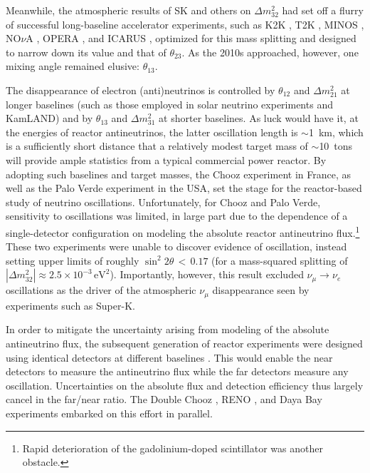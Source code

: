 \documentclass[../thesis.tex]{subfiles}
\begin{document}
Meanwhile, the atmospheric results of SK and others on \(\Delta m^2_{32}\) had set off a flurry of successful long-baseline accelerator experiments, such as K2K \cite{PhysRevD.74.072003}, T2K \cite{ABE2011106}, MINOS \cite{PhysRevLett.101.131802}, NO$\nu$A \cite{PhysRevLett.123.151803}, OPERA \cite{Agafonova_2012}, and ICARUS \cite{Rubbia_2011}, optimized for this mass splitting and designed to narrow down its value and that of $\theta_{23}$. As the 2010s approached, however, one mixing angle remained elusive: $\theta_{13}$.

The disappearance of electron (anti)neutrinos is controlled by $\theta_{12}$ and \(\Delta m^2_{21}\) at longer baselines (such as those employed in solar neutrino experiments and KamLAND) and by $\theta_{13}$ and \(\Delta m^2_{31}\) at shorter baselines. As luck would have it, at the energies of reactor antineutrinos, the latter oscillation length is $\sim$1~km, which is a sufficiently short distance that a relatively modest target mass of $\sim$10~tons will provide ample statistics from a typical commercial power reactor. By adopting such baselines and target masses, the Chooz experiment in France, as well as the Palo Verde experiment in the USA, set the stage for the reactor-based study of neutrino oscillations. Unfortunately, for Chooz and Palo Verde, sensitivity to oscillations was limited, in large part due to the dependence of a single-detector configuration on modeling the absolute reactor antineutrino flux.\footnote{Rapid deterioration of the gadolinium-doped scintillator was another obstacle.} These two experiments were unable to discover evidence of oscillation, instead setting upper limits of roughly $\sin^2 2\theta\,<\,0.17$ (for a mass-squared splitting of $|\Delta m^2_{32}| \approx 2.5\times10^{-3}\,\text{eV}^2$). Importantly, however, this result excluded $\nu_\mu \rightarrow \nu_e$ oscillations as the driver of the atmospheric $\nu_\mu$ disappearance seen by experiments such as Super-K.

In order to mitigate the uncertainty arising from modeling of the absolute antineutrino flux, the subsequent generation of reactor experiments were designed using identical detectors at different baselines \cite{Mikaelyan:1998yg}. This would enable the near detectors to measure the antineutrino flux while the far detectors measure any oscillation. Uncertainties on the absolute flux and detection efficiency thus largely cancel in the far/near ratio. The Double Chooz \cite{Ardellier:2006mn}, RENO \cite{Ahn:2010vy}, and Daya Bay \cite{Guo:2007ug} experiments embarked on this effort in parallel.
\end{document}
